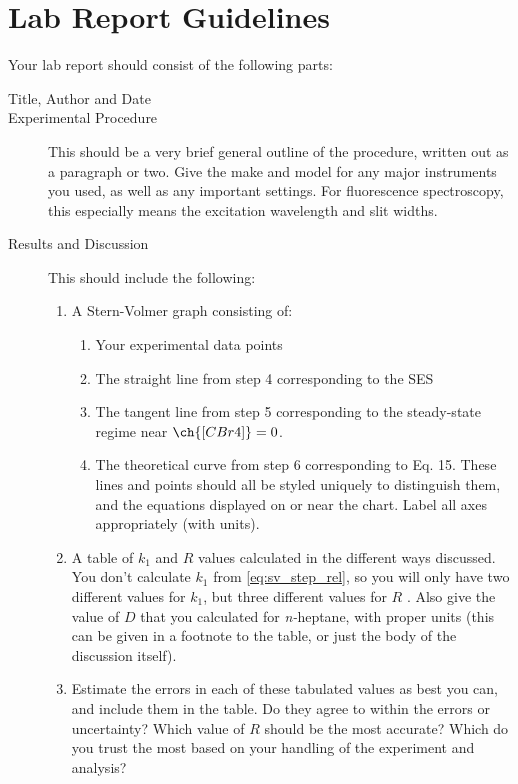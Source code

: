 \documentclass[nobib,nofonts,nols,nohyper]{tufte-handout}
\begin{document}
\section{Lab Report Guidelines} %
\label{sec:lab_report_guidelines}

Your lab report should consist of the following parts:
\begin{description}
	\item[Title, Author and Date]
	\item[Experimental Procedure] This should be a very brief general outline of the procedure, written out as a paragraph or two. Give the make and model for any major instruments you used, as well as any important settings. For fluorescence spectroscopy, this especially means the excitation wavelength and slit widths.
	\item[Results and Discussion] This should include the following:
	\begin{enumerate}
		\item A Stern-Volmer graph consisting of:
		\begin{enumerate}
			\item Your experimental data points
			\item The straight line from step 4 corresponding to the SES
			\item The tangent line from step 5 corresponding to the steady-state regime near \( \ch{[CBr4]} = 0 \).
			\item The theoretical curve from step 6 corresponding to Eq. 15. 
			These lines and points should all be styled uniquely to distinguish them, and the equations displayed on or near the chart. 
			Label all axes appropriately (with units).
		\end{enumerate}
		\item A table of \( k_1 \) and \( R \) values calculated in the different ways discussed. 
		You don’t calculate \( k_1 \) from \cref{eq:sv_step_rel}, so you will only have two different values for \( k_1 \), but three different values for \( R \) . 
		Also give the value of \( D \) that you calculated for \emph{n-}heptane, with proper units (this can be given in a footnote to the table, or just the body of the discussion itself).
		\item Estimate the errors in each of these tabulated values as best you can, and include them in the table. 
		Do they agree to within the errors or uncertainty? 
		Which value of \( R \) should be the most accurate? 
		Which do you trust the most based on your handling of the experiment and analysis?

\end{enumerate}
\end{description}
\end{document}
